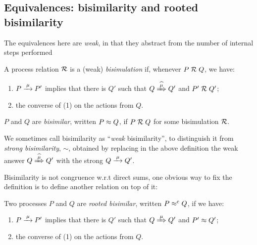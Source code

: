 \subsection{Equivalences: bisimilarity and rooted bisimilarity}
\label{ss:BiEx}

The equivalences here are 
 \emph{weak}, in that they
abstract from the number of internal steps performed
\begin{definition}[bisimilarity]
\label{d:wb}
A process relation ${{\cal R}}$ 
 is a (weak) \emph{bisimulation} if, whenever
 $P\mathrel{\cal R} Q$, %
we have:
\begin{enumerate}
\item 
    $P \arr\mu P'$   implies that there is $Q'$ such that $Q \Arcap \mu Q'$ and $P' \mathrel{\cal R} Q'$;
\item the converse of (1)
 on the actions from $Q$.
\end{enumerate}  
 $P$ and $Q$ are \emph{bisimilar},
written $P \approx
 Q$, if $P \mathrel{\cal R} Q$ for some  bisimulation ${\cal R}$.  
\end{definition} 

We sometimes call bisimilarity as ``\emph{weak} bisimilarity'', to
distinguish it from \emph{strong bisimilarity}, $\sim$,
obtained by replacing in the above definition   the weak answer $
Q\Arcap\mu Q'$ with the strong  $Q \arr \mu Q'$.

Bisimilarity is not congruence w.r.t direct sums, one obvious way to
fix the definition is to define another relation on top of it:
\begin{definition}
\label{d:rootedBisimilarity}
Two processes $P$ and $Q$ are \emph{rooted bisimilar}, written $P
\mathrel{\approx^{\rm{c}}} Q$, if we have:
\begin{enumerate}
 \item  $P \arr\mu P'$ implies that there is $Q'$ such that $Q
   \Arr\mu Q'$ and $P' \approx Q'$;
\item the converse of (1) on the actions from $Q$.
\end{enumerate}
\end{definition}

